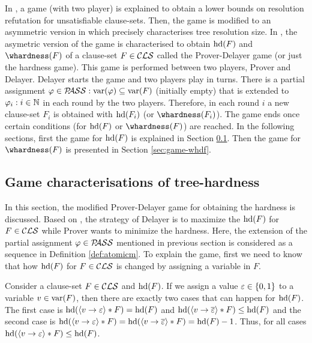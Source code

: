 \documentclass{report}
\begin{document}
In \cite{PI2000}, a game (with two player) is explained to obtain a lower bounds on resolution refutation for unsatisfiable clause-sets. Then, the game is modified to an asymmetric version in \cite{BGL13a} which precisely characterises tree resolution size. In \cite{BeyersdorffKullmann2014PHP,BeyersdorffGwynneKullmann2013PHPER}, the asymetric version of the game is characterised to obtain $\operatorname{hd}(F)$ and $\whardness(F)$ of a clause-set $F \in \mathcal{CLS}$ called the Prover-Delayer game (or just the hardness game). This game is performed between two players, Prover and Delayer. Delayer starts the game and two players play in turns. There is a partial assignment $\varphi \in \mathcal{P\hspace{-0.32em}ASS}: \operatorname{var}(\varphi) \subseteq \operatorname{var}(F)$ (initially empty) that is extended to $\varphi_i: i \in \mathbb{N}$ in each round by the two players. Therefore, in each round $i$ a new clause-set $F_i$ is obtained with $\operatorname{hd}(F_i)$ (or $\whardness(F_i)$). The game ends once certain conditions (for $\operatorname{hd}(F)$ or $\whardness(F)$) are reached. In the following sections, first the game for $\operatorname{hd}(F)$ is explained in Section \ref{sec:game-hdf}. Then the game for $\whardness(F)$ is presented in Section \ref{sec:game-whdf}.

\subsection{Game characterisations of tree-hardness}
\label{sec:game-hdf}

In this section, the modified Prover-Delayer game for obtaining the hardness is discussed. Based on \cite{BeyersdorffKullmann2014PHP}, the strategy of Delayer is to maximize the $\operatorname{hd}(F)$ for $F \in \mathcal{CLS}$ while Prover wants to minimize the hardness. Here, the extension of the partial assignment $\varphi \in \mathcal{P\hspace{-0.32em}ASS}$ mentioned in previous section is considered as a sequence in Definition \ref{def:atomicm}. To explain the game, first we need to know that how $\operatorname{hd}(F)$ for $F \in \mathcal{CLS}$ is changed by assigning a variable in $F$. 

\begin{lem}\label{lem:hd-var}
\cite{BeyersdorffKullmann2014PHP} Consider a clause-set $F \in \mathcal{CLS}$ and $\operatorname{hd}(F)$. If we assign a value $\varepsilon \in \{ 0,1 \}$ to a variable $v \in \operatorname{var}(F)$, then there are exactly two cases that can happen for $\operatorname{hd}(F)$. The first case is $\operatorname{hd}(\langle v \rightarrow \varepsilon \rangle*F)=\operatorname{hd}(F)$ and $\operatorname{hd}(\langle v \rightarrow \overline {\varepsilon} \rangle*F) \leq \operatorname{hd}(F)$ and the second case is  $\operatorname{hd}(\langle v \rightarrow \varepsilon \rangle*F)=\operatorname{hd}(\langle v \rightarrow \overline {\varepsilon} \rangle*F)=\operatorname{hd}(F)-1$. Thus, for all cases  $\operatorname{hd}(\langle v \rightarrow \varepsilon \rangle*F) \leq \operatorname{hd}(F)$.
\end{lem}
\end{document}
